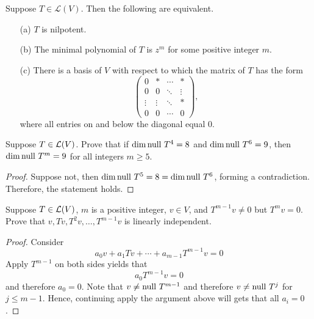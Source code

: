\documentclass{extarticle}
\begin{document}
\begin{thm}
    Suppose \( T \in \mathcal{L}(V) \). Then the following are equivalent.
    \begin{itemize}
        \item[(a)] \( T \) is nilpotent.
        \item[(b)] The minimal polynomial of \( T \) is \( z^m \) for some positive integer \( m \).
        \item[(c)] There is a basis of \( V \) with respect to which the matrix of \( T \) has the form
        \[
        \begin{pmatrix}
        0 & * & \cdots & * \\
        0 & 0 & \ddots & \vdots \\
        \vdots & \vdots & \ddots & * \\
        0 & 0 & \cdots & 0
        \end{pmatrix},
        \]
        where all entries on and below the diagonal equal 0.
    \end{itemize}
\end{thm}


\newpage 
{}

\begin{problem}{1}
    Suppose \(T \in \mathcal{L}(V)\). Prove that if \(\dim \text{null } T^4 = 8\) and \(\dim 
    \text{null } T^6 = 9\), then \(\dim \text{null } T^m = 9\) for all  integers \(m \geq 5\).
\end{problem}

\begin{proof}
Suppose not, then \(\dim \text{null } T^5 = 8 = \dim \text{null } T^6\), forming a contradiction. Therefore, 
the statement holds. 
\end{proof}

\begin{problem}{2}
    Suppose \(T \in \mathcal{L}(V)\), \(m\) is a positive integer, \(v \in V\), and \(T^{m-1}v  \neq 0\) 
    but \(T^m v = 0\). Prove that \(v, Tv, T^2v, \ldots, T^{m-1}v\) is linearly independent. 
\end{problem}

\begin{proof}
Consider 
\[a_0 v + a_1 Tv + \cdots + a_{m-1}T^{m-1}v = 0\]
Apply \(T^{m-1}\) on both sides yields that 
\[a_0 T^{m-1} v = 0\]
and therefore \(a_0 = 0\). Note that \(v \neq \text{null } T^{m-1}\) and therefore 
\(v \neq \text{null } T^j\) for \(j \leq m-1\). Hence, continuing apply the argument above will 
gets that all \(a_i = 0\).
\end{proof}
\end{document}
